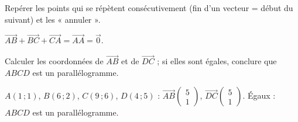 Repérer les points qui se répètent consécutivement (fin d'un vecteur = début du suivant) et
les « annuler ».
\begin{exemple}
$\vec{AB}+\vec{BC}+\vec{CA}=\vec{AA}=\vec 0$.
\end{exemple}

Calculer les coordonnées de $\vec{AB}$ et de $\vec{DC}$ ; si elles sont égales, conclure que
$ABCD$ est un parallélogramme.
\begin{exemple}
$A(1\,;1)$, $B(6\,;2)$, $C(9\,;6)$, $D(4\,;5)$ : $\vec{AB}\begin{pmatrix}5\\1\end{pmatrix}$,
$\vec{DC}\begin{pmatrix}5\\1\end{pmatrix}$. Égaux : $ABCD$ est un parallélogramme.
\end{exemple}

